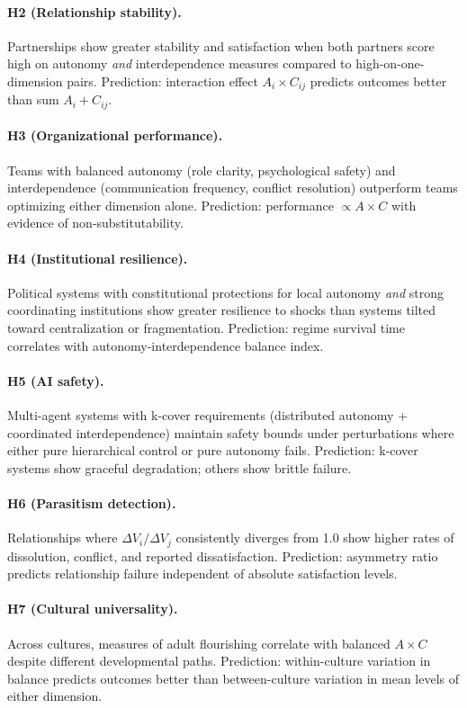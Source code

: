 \documentclass[11pt,a4paper]{article}
\begin{document}
\paragraph{H2 (Relationship stability).} Partnerships show greater stability and satisfaction when both partners score high on autonomy \emph{and} interdependence measures compared to high-on-one-dimension pairs. Prediction: interaction effect $A_i \times C_{ij}$ predicts outcomes better than sum $A_i + C_{ij}$.

\paragraph{H3 (Organizational performance).} Teams with balanced autonomy (role clarity, psychological safety) and interdependence (communication frequency, conflict resolution) outperform teams optimizing either dimension alone. Prediction: performance $\propto A \times C$ with evidence of non-substitutability.

\paragraph{H4 (Institutional resilience).} Political systems with constitutional protections for local autonomy \emph{and} strong coordinating institutions show greater resilience to shocks than systems tilted toward centralization or fragmentation. Prediction: regime survival time correlates with autonomy-interdependence balance index.

\paragraph{H5 (AI safety).} Multi-agent systems with k-cover requirements (distributed autonomy + coordinated interdependence) maintain safety bounds under perturbations where either pure hierarchical control or pure autonomy fails. Prediction: k-cover systems show graceful degradation; others show brittle failure.

\paragraph{H6 (Parasitism detection).} Relationships where $\Delta V_i / \Delta V_j$ consistently diverges from 1.0 show higher rates of dissolution, conflict, and reported dissatisfaction. Prediction: asymmetry ratio predicts relationship failure independent of absolute satisfaction levels.

\paragraph{H7 (Cultural universality).} Across cultures, measures of adult flourishing correlate with balanced $A \times C$ despite different developmental paths. Prediction: within-culture variation in balance predicts outcomes better than between-culture variation in mean levels of either dimension.
\end{document}
